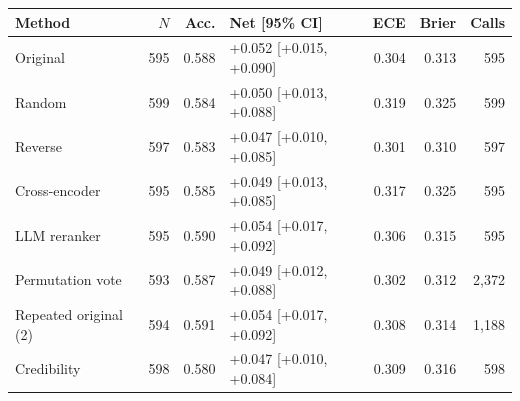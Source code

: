 \begin{tabular}{lrrlrrr}
\toprule
Method & $N$ & Acc. & Net [95\% CI] & ECE & Brier & Calls \\
\midrule
Original & 595 & 0.588 & +0.052 [+0.015, +0.090] & 0.304 & 0.313 & 595 \\
Random & 599 & 0.584 & +0.050 [+0.013, +0.088] & 0.319 & 0.325 & 599 \\
Reverse & 597 & 0.583 & +0.047 [+0.010, +0.085] & 0.301 & 0.310 & 597 \\
Cross-encoder & 595 & 0.585 & +0.049 [+0.013, +0.085] & 0.317 & 0.325 & 595 \\
LLM reranker & 595 & 0.590 & +0.054 [+0.017, +0.092] & 0.306 & 0.315 & 595 \\
Permutation vote & 593 & 0.587 & +0.049 [+0.012, +0.088] & 0.302 & 0.312 & 2,372 \\
Repeated original (2) & 594 & 0.591 & +0.054 [+0.017, +0.092] & 0.308 & 0.314 & 1,188 \\
Credibility & 598 & 0.580 & +0.047 [+0.010, +0.084] & 0.309 & 0.316 & 598 \\
\bottomrule
\end{tabular}
